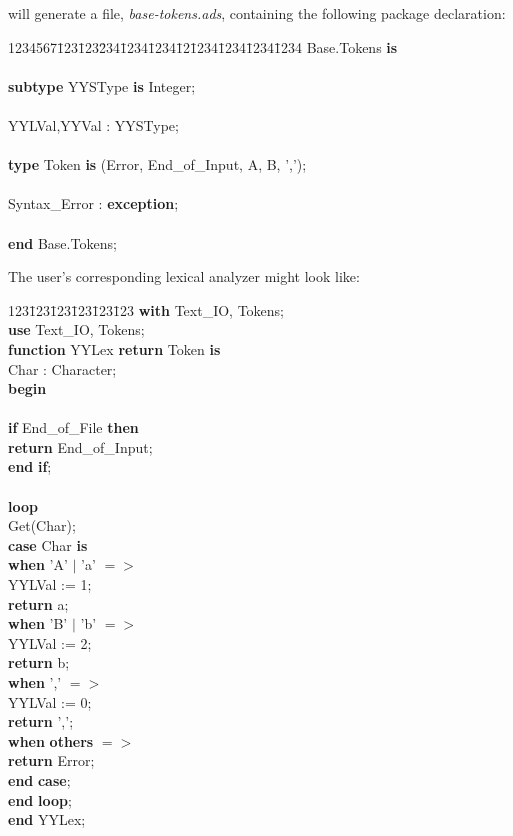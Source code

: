 \ayacc will generate a file,
{\it base-tokens.ads},
containing the following package declaration:
\begin{tabbing}
1234567\=123\=123\=234\=1234\=1234\=12\=1234\=1234\=1234\=1234 \kill
{} Base.Tokens {\bf is}\\
\\
\>\>  {\bf subtype} YYSType {\bf is} Integer;\\
\\
\>\>  YYLVal,YYVal : YYSType;\\
\\
\>\>  {\bf type} Token {\bf is} (Error, End\_of\_Input, A, B, ',');\\
\\
\>\>  Syntax\_Error : {\bf exception};\\
\\
{\bf end} Base.Tokens;\\
\end{tabbing}
\newpage
\noindent The user's corresponding lexical analyzer might look like:
\begin{tabbing}
123\=123\=123\=123\=123\=123 \kill
{\bf with} Text\_IO, Tokens;\\
{\bf use}  Text\_IO, Tokens;\\
{\bf function} YYLex {\bf return} Token {\bf is}\\
\>  Char : Character;\\
{\bf begin}\\
\\
\>  {\bf if} End\_of\_File {\bf then}\\
\>\>    {\bf return} End\_of\_Input;\\
\>  {\bf end} {\bf if};\\
\\
\>  {\bf loop}\\
\>\>    Get(Char);\\
\>\>    {\bf case} Char {\bf is}\\
\>\>\>      {\bf when} 'A' $|$ 'a' $=>$\\
\>\>\>\>        YYLVal := 1;\\
\>\>\>\>        {\bf return} a;\\
\>\>\>      {\bf when} 'B' $|$ 'b' $=>$\\
\>\>\>\>        YYLVal := 2;\\
\>\>\>\>        {\bf return} b;\\
\>\>\>      {\bf when} ','       $=>$\\
\>\>\>\>        YYLVal := 0;\\
\>\>\>\>        {\bf return} ',';\\
\>\>\>      {\bf when} {\bf others}    $=>$\\
\>\>\>\>        {\bf return} Error;\\
\>\>    {\bf end} {\bf case};\\
\>  {\bf end} {\bf loop};\\
{\bf end} YYLex;\\
\end{tabbing}

